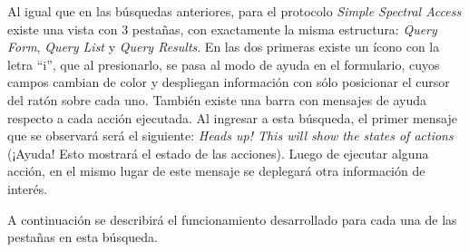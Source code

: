 Al igual que en las búsquedas anteriores, para el protocolo \emph{Simple
Spectral Access} existe una vista con 3 pestañas, con exactamente la
misma estructura: \emph{Query Form}, \emph{Query List} y \emph{Query
Results}. En las dos primeras existe un ícono con la letra ``i'', que
al presionarlo, se pasa al modo de ayuda en el formulario, cuyos
campos cambian de color y despliegan información con sólo posicionar
el cursor del ratón sobre cada uno. También existe una barra con
mensajes de ayuda respecto a cada acción ejecutada. Al ingresar a esta
búsqueda, el primer mensaje que se observará será el siguiente:
\emph{Heads up! This will show the states of actions} (¡Ayuda! Esto
mostrará el estado de las acciones). Luego de ejecutar alguna acción,
en el mismo lugar de este mensaje se deplegará otra información de
interés.

A continuación se describirá el funcionamiento desarrollado para cada
una de las pestañas en esta búsqueda.

